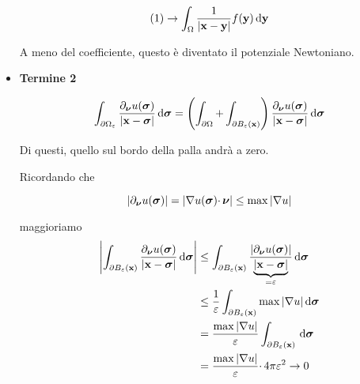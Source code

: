 \begin{dimostrazione}
\begin{itemize}
              \begin{equation*}
                  (1)\rightarrow \int _{\Omega }\frac{1}{| \mathbf{x} -\mathbf{y}| } f(\mathbf{y}) \,\mathrm d \mathbf{y}
              \end{equation*}

              A meno del coefficiente, questo è diventato il potenziale Newtoniano.
        \item \textbf{Termine 2}

              \begin{equation*}
                  \int _{\partial \Omega _{\varepsilon }}\frac{\partial _{\bm{\nu}} u(\bm{\sigma})}{| \mathbf{x} -\bm{\sigma}| } \,\mathrm d \bm{\sigma} =\left(\int _{\partial \Omega } +\int _{\partial B_{\varepsilon }(\mathbf{x})}\right)\frac{\partial _{\bm{\nu}} u(\bm{\sigma})}{| \mathbf{x} -\bm{\sigma}| } \,\mathrm d \bm{\sigma}
              \end{equation*}

              Di questi, quello sul bordo della palla andrà a zero.

              Ricordando che

              \begin{equation*}
                  | \partial _{\bm{\nu}} u(\bm{\sigma})| =| \nabla u(\bm{\sigma}) \cdotp \bm{\nu}| \leq \max| \nabla u|
              \end{equation*}

              maggioriamo
              \begin{align*}
                  \left| \int _{\partial B_{\varepsilon }(\mathbf{x})}\frac{\partial _{\bm{\nu}} u(\bm{\sigma})}{| \mathbf{x} -\bm{\sigma}| } \,\mathrm d \bm{\sigma}\right| & \leq \int _{\partial B_{\varepsilon }(\mathbf{x})}\frac{| \partial _{\bm{\nu}} u(\bm{\sigma})| }{\underbrace{| \mathbf{x} -\bm{\sigma}| }_{=\varepsilon }} \,\mathrm d \bm{\sigma} \\
                                                                                                                           & \leq \frac{1}{\varepsilon }\int _{\partial B_{\varepsilon }(\mathbf{x})}\max| \nabla u| \,\mathrm d \bm{\sigma}                                            \\
                                                                                                                           & =\frac{\max| \nabla u| }{\varepsilon }\int _{\partial B_{\varepsilon }(\mathbf{x})} \,\mathrm d \bm{\sigma}                                                     \\
                                                                                                                           & =\frac{\max| \nabla u| }{\varepsilon } \cdotp 4\pi \varepsilon ^{2}\rightarrow 0
              \end{align*}


\end{itemize}
\end{dimostrazione}
